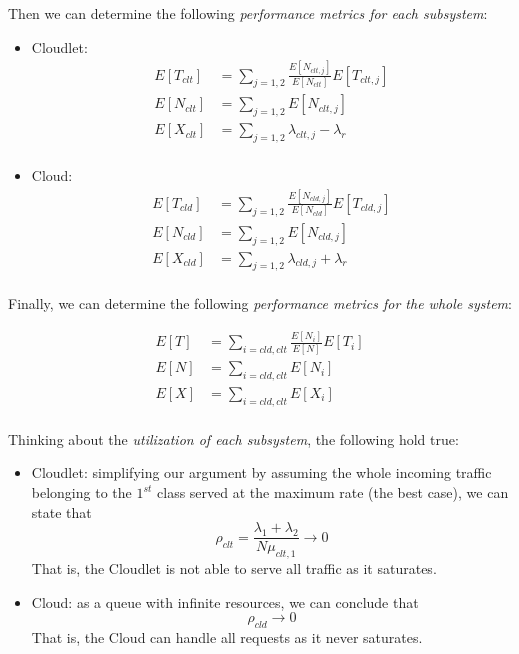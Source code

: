 Then we can determine the following \textit{performance metrics for each subsystem}:

\begin{itemize}
	\item Cloudlet:
	\begin{equation} 
	\begin{split}
	E[T_{clt}] &= \sum_{j=1,2}\frac{E[N_{clt,j}]}{E[N_{clt}]}E[T_{clt,j}] \\
	E[N_{clt}] &= \sum_{j=1,2}E[N_{clt,j}] \\
	E[X_{clt}] &= \sum_{j=1,2}\lambda_{clt,j}-\lambda_{r} \\
	\end{split}
	\end{equation}
	
	\item Cloud:
	\begin{equation} 
	\begin{split}
	E[T_{cld}] &= \sum_{j=1,2}\frac{E[N_{cld,j}]}{E[N_{cld}]}E[T_{cld,j}] \\
	E[N_{cld}] &= \sum_{j=1,2}E[N_{cld,j}] \\
	E[X_{cld}] &= \sum_{j=1,2}\lambda_{cld,j}+\lambda_{r} \\
	\end{split}
	\end{equation}
\end{itemize}

Finally, we can determine the following \textit{performance metrics for the whole system}:

\begin{equation} 
\begin{split}
E[T] &= \sum_{i=cld,clt}\frac{E[N_{i}]}{E[N]}E[T_{i}] \\
E[N] &= \sum_{i=cld,clt}E[N_{i}] \\
E[X] &= \sum_{i=cld,clt}E[X_{i}] \\
\end{split}
\end{equation}

Thinking about the \textit{utilization of each subsystem}, the following hold true:

\begin{itemize}
	\item Cloudlet: simplifying our argument by assuming the whole incoming traffic belonging to the $1^{st}$ class served at the maximum rate (the best case), we can state that
	\begin{equation} 
	\rho_{clt} = \frac{\lambda_{1}+\lambda_{2}}{N\mu_{clt,1}}\rightarrow 0
	\end{equation}
	That is, the Cloudlet is not able to serve all traffic as it saturates.
	
	\item Cloud: as a queue with infinite resources, we can conclude that
	\begin{equation}
	\rho_{cld} \rightarrow 0
	\end{equation}
	That is, the Cloud can handle all requests as it never saturates.
\end{itemize}


